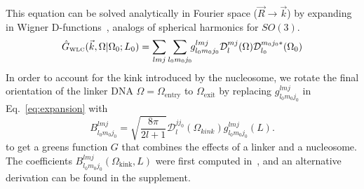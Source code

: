 \documentclass[%
 reprint,
superscriptaddress,
showpacs,preprintnumbers,
 amsmath,amssymb,
 aps,
 prl,
]{revtex4-1}
\newcommand{\ghat}[2][\Omega_0; L_0]{\hat{G}_\text{\tiny WLC}(#2|#1)}
\newcommand{\wigD}{\mathcal{D}}
\begin{document}
This equation can be solved analytically in Fourier space
    ($\vec{R} \rightarrow \vec{k}$) by expanding in Wigner
    D-functions~\cite{spakowitz2006}, analogs of spherical harmonics for
    $SO(3)$.
\begin{equation}\label{eq:expansion}
    \ghat{\vec{k}, \Omega} = \sum_{l m j}\sum_{l_0 m_0 j_0} \!\! g_{l_0 m_0 j_0}^{lmj}
        \wigD_l^{mj}(\Omega)\wigD_{l_0}^{m_0 j_0 *}(\Omega_0)
\end{equation}
In order to account for the kink introduced by the nucleosome, we rotate
    the final orientation of the linker DNA ${\Omega = \Omega_\text{entry}}$ to
    $\Omega_\text{exit}$ by replacing
    $g_{l_0 m_0 j_0}^{lmj}$ in Eq.~\ref{eq:expansion} with
    \begin{equation}\label{eq:coeffs}
        B_{l_{0}m_{0}j_{0}}^{lmj} = %
        \sqrt{\frac{8\pi}{2l+1}}
        \mathcal{D}_{l}^{jj_{0}}
        \left(\Omega_{kink}\right)g_{l_{0}m_{0}j_{0}}^{lmj}\left(L\right).
    \end{equation}
    to get a greens function $G$ that combines the effects of a linker and a
    nucleosome.
The coefficients $B_{l_0 m_0 j_0}^{lmj}(\Omega_\text{kink}, L)$ were first
    computed in~\cite{zhou2003}, and an alternative derivation can be found in
    the supplement.
\end{document}

